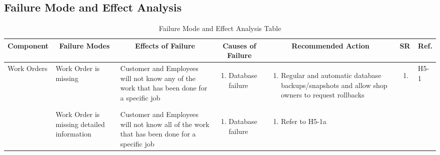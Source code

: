 \documentclass{article}
\begin{document}
\newpage
\begin{landscape}
	\section{Failure Mode and Effect Analysis}
	\begin{longtable}{|p{}|p{}|p{}|p{}|p{}|p{}|p{}|}
		\caption{Failure Mode and Effect Analysis Table}                                                                \\
		\hline
		\multicolumn{1}{|c|}{\textbf{Component}}
		 & \multicolumn{1}{|c|}{\textbf{Failure Modes}}
		 & \multicolumn{1}{|c|}{\textbf{Effects of Failure}}
		 & \multicolumn{1}{|c|}{\textbf{Causes of Failure}}
		 & \multicolumn{1}{|c|}{\textbf{Recommended Action}}
		 & \multicolumn{1}{|c|}{\textbf{SR}}
		 & \multicolumn{1}{|c|}{\textbf{Ref.}}                                                                          \\
		\hline
		\multirow{2}{*}{Work Orders}
		 & Work Order is missing
		 & Customer and Employees will not know any of the work that has been done for a specific job
		 & \begin{enumerate}[label=\alph*., leftmargin=*]
			   \item Database failure
		   \end{enumerate}
		 & \begin{enumerate}[label=\alph*., leftmargin=*]
			   \item Regular and automatic database backups/snapshots and allow shop owners to request rollbacks
		   \end{enumerate}
		 & \begin{enumerate}[label=\alph*., leftmargin=*]
			   \item
		   \end{enumerate}
		 & H5-1                                                                                                         \\
		\cline{2-7}
		~
		 & Work Order is missing detailed information
		 & Customer and Employees will not know all of the work that has been done for a specific job
		 & \begin{enumerate}[label=\alph*., leftmargin=*]
			   \item Database failure
		   \end{enumerate}
		 & \begin{enumerate}[label=\alph*., leftmargin=*]
			   \item Refer to H5-1a

\end{enumerate}
\end{longtable}
\end{landscape}
\end{document}
